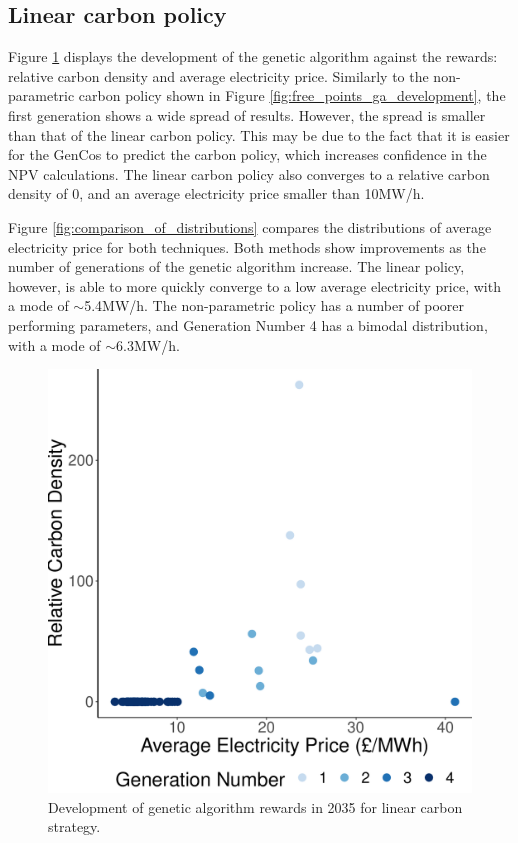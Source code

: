 \subsection{Linear carbon policy}
\label{sssec:result_linear_carbon_strategy}

Figure \ref{fig:linear_ga_development} displays the development of the genetic algorithm against the rewards: relative carbon density and average electricity price. Similarly to the non-parametric carbon policy shown in Figure \ref{fig:free_points_ga_development}, the first generation shows a wide spread of results. However, the spread is smaller than that of the linear carbon policy. This may be due to the fact that it is easier for the GenCos to predict the carbon policy, which increases confidence in the NPV calculations. The linear carbon policy also converges to a relative carbon density of 0, and an average electricity price smaller than \textsterling10MW/h.

Figure \ref{fig:comparison_of_distributions} compares the distributions of average electricity price for both techniques. Both methods show improvements as the number of generations of the genetic algorithm increase.  The linear policy, however, is able to more quickly converge to a low average electricity price, with a mode of ${\sim}$\textsterling5.4MW/h. The non-parametric policy has a number of poorer performing parameters, and Generation Number 4 has a bimodal distribution, with a mode of ${\sim}$\textsterling6.3MW/h.

\begin{figure}
	\centering
	\includegraphics[width=0.5\linewidth]{Chapter6/figures/results/linear_ga_development.pdf}
	\caption{Development of genetic algorithm rewards in 2035 for linear carbon strategy.}
	\label{fig:linear_ga_development}
\end{figure}





